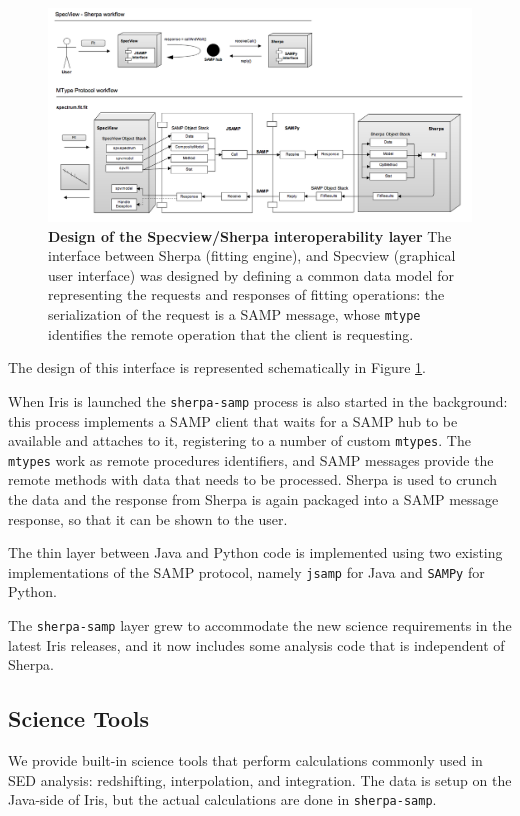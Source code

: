 \documentclass[final,5p]{elsarticle}
\begin{document}
\begin{figure}
\begin{center}
\includegraphics[width=\textwidth]{figures/sherpasamp.png}
\caption{\textbf{Design of the Specview/Sherpa interoperability layer} The interface between Sherpa (fitting engine), and Specview (graphical user interface) was designed by defining a common data model for representing the requests and responses of fitting operations: the serialization of the request is a SAMP message, whose \texttt{mtype} identifies the remote operation that the client is requesting.}
\label{fig:sherpasamp}
\end{center}
\end{figure}

The design of this interface is represented schematically in Figure \ref{fig:sherpasamp}.

When Iris is launched the \verb|sherpa-samp| process is also started in the background: this process implements a SAMP client that waits for a SAMP hub to be available and attaches to it, registering to a number of custom \verb|mtypes|. The \verb|mtypes| work as remote procedures identifiers, and SAMP messages provide the remote methods with data that needs to be processed. Sherpa is used to crunch the data and the response from Sherpa is again packaged into a SAMP message response, so that it can be shown to the user.

The thin layer between Java and Python code is implemented using two existing implementations of the SAMP protocol, namely \verb|jsamp| for Java and \verb|SAMPy| for Python.

The \verb|sherpa-samp| layer grew to accommodate the new science requirements in the latest Iris releases, and it now includes some analysis code that is independent of Sherpa.

\subsection{Science Tools}
We provide built-in science tools that perform calculations commonly used in SED analysis: redshifting, interpolation, and integration. The data is setup on the Java-side of Iris, but the actual calculations are done in \verb|sherpa-samp|.
\end{document}
